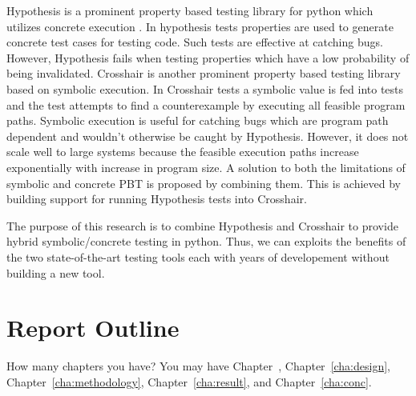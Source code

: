 Hypothesis is a prominent property based testing library for python which utilizes concrete execution . In hypothesis tests properties are used to generate concrete test cases for testing code. Such tests are effective at catching bugs. However, Hypothesis fails when testing properties which have a low probability of being invalidated. Crosshair is another prominent property based testing library based on symbolic execution. In Crosshair tests a symbolic value is fed into tests and the test attempts to find a counterexample by executing all feasible program paths. Symbolic execution is useful for catching bugs which are program path dependent and wouldn’t otherwise be caught by Hypothesis. However, it does not scale well to large systems because the feasible execution paths increase exponentially with increase in program size. A solution to both the limitations of symbolic and concrete PBT is proposed by combining them. This is achieved by building support for running Hypothesis tests into Crosshair.

The purpose of this research is to combine Hypothesis and Crosshair to provide hybrid symbolic/concrete testing in python. Thus, we can exploits the benefits of the two state-of-the-art testing tools each with years of developement without building a new tool.


\section{Report Outline}
\label{sec:outline}

How many chapters you have? You may have Chapter~,
Chapter~\ref{cha:design}, Chapter~\ref{cha:methodology},
Chapter~\ref{cha:result}, and Chapter~\ref{cha:conc}.
